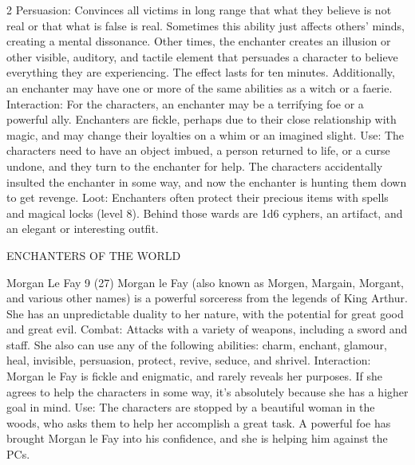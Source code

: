 \begin{multicols}{2}
Persuasion: Convinces all victims in long range that what they believe is not real or that what is false is real. Sometimes this ability just affects others’ minds, creating a mental dissonance. Other times, the enchanter creates an illusion or other visible, auditory, and tactile element that persuades a character to believe everything they are
experiencing. The effect lasts for ten minutes. Additionally, an enchanter may have one or more of the same abilities as a witch or a faerie.
Interaction: For the characters, an enchanter may be a terrifying foe or a powerful ally. Enchanters are fickle, perhaps due to their close relationship with magic, and may change their loyalties on a whim or an imagined slight.
Use: The characters need to have an object imbued, a person returned to life, or a curse undone, and they turn to the enchanter for help. The characters accidentally insulted
the enchanter in some way, and now the enchanter is hunting them down to get revenge.
Loot: Enchanters often protect their precious items with spells and magical locks (level 8). Behind those wards are 1d6 cyphers, an artifact, and an elegant or interesting outfit.

ENCHANTERS OF THE WORLD

Morgan Le Fay 9 (27)
Morgan le Fay (also known as Morgen, Margain, Morgant, and various other names) is a powerful sorceress from the legends of King Arthur. She has an unpredictable duality to her nature, with the potential for great good and great evil.
Combat: Attacks with a variety of weapons, including a sword and staff. She also can use
any of the following abilities: charm, enchant, glamour, heal, invisible, persuasion,
protect, revive, seduce, and shrivel.
Interaction: Morgan le Fay is fickle and enigmatic, and rarely reveals her purposes. If she
agrees to help the characters in some way, it’s absolutely because she has a higher goal
in mind.
Use: The characters are stopped by a beautiful woman in the woods, who asks them to
help her accomplish a great task. A powerful foe has brought Morgan le Fay into his confidence, and she is helping him against the PCs.


\end{multicols}
